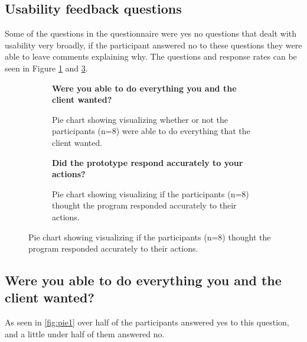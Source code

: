 \subsection{Usability feedback questions}
Some of the questions in the questionnaire were yes no questions that dealt with usability very broadly, if the participant answered no to these questions they were able to leave comments explaining why. The questions and response rates can be seen in Figure \ref{fig:pie1} and \ref{fig:pie2}.
\begin{figure}[H]
	\centering
	\begin{minipage}[b]{0.49\textwidth}
		\begin{figure}[H]
			\centering
		\textbf{	Were you able to do everything you and the client wanted?}
			\caption{Pie chart showing visualizing whether or not the participants (n=8) were able to do everything that the client wanted.}
			\label{fig:pie1}
		\end{figure}
	\end{minipage}
	\hfill
	\begin{minipage}[b]{0.49\textwidth}
		\begin{figure}[H]
			\centering
			\textbf{	Did the prototype respond accurately to your actions?}
			\caption{Pie chart showing visualizing if the participants (n=8) thought the program responded accurately to their actions.}
			\label{fig:pie2}
		\end{figure}
	\end{minipage}
\end{figure}

\subsection*{Were you able to do everything you and the client wanted?}
As seen in \autoref{fig:pie1} over half of the participants answered yes to this question, and a little under half of them answered no.

